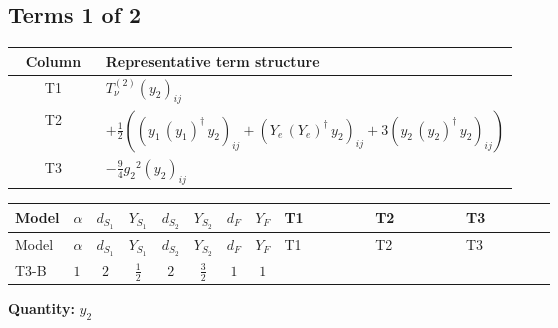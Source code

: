 \documentclass[8pt]{article}
\begin{document}
\begin{landscape}
\subsection*{Terms 1 of 2}
\begin{center}
\begin{tabular}{@{}c >{\raggedright\arraybackslash}p{0.82\linewidth}@{}}
\toprule
Column & Representative term structure \\
\midrule
T1 & \(\displaystyle T_{\nu}^{(2)} \left({y_2}\right)_{ij}\) \\
\midrule
T2 & \(\displaystyle +\frac{1}{2} (\left({y_1}\,\left({y_1}\right)^{\dagger}\,{y_2}\right)_{ij}+\left({Y_e}\,\left({Y_e}\right)^{\dagger}\,{y_2}\right)_{ij}+3 \left({y_2}\,\left({y_2}\right)^{\dagger}\,{y_2}\right)_{ij})\) \\
\midrule
T3 & \(\displaystyle -\frac{9}{4} {g_2}^2 \left({y_2}\right)_{ij}\) \\
\midrule
\bottomrule
\end{tabular}
\end{center}
\smallskip
\tiny
\begin{longtable}{@{}llcccccc >{\raggedright\arraybackslash}p{0.21\linewidth} >{\raggedright\arraybackslash}p{0.21\linewidth} >{\raggedright\arraybackslash}p{0.21\linewidth}@{}}
\toprule
Model & $\alpha$ & $d_{S_1}$ & $Y_{S_1}$ & $d_{S_2}$ & $Y_{S_2}$ & $d_F$ & $Y_F$ & T1 & T2 & T3 \\
\midrule
\endfirsthead
\toprule
Model & $\alpha$ & $d_{S_1}$ & $Y_{S_1}$ & $d_{S_2}$ & $Y_{S_2}$ & $d_F$ & $Y_F$ & T1 & T2 & T3 \\
\midrule
\endhead
T3-B & $1$ & $2$ & $\frac{1}{2}$ & $2$ & $\frac{3}{2}$ & $1$ & $1$ & \scriptsize\adjustbox{max width=\linewidth}{$\begin{gathered} T_{\nu}^{(2)} \left({y_2}\right)_{ij}\end{gathered}$} & \scriptsize\adjustbox{max width=\linewidth}{$\begin{gathered} +\frac{1}{2} (\left({y_1}\,\left({y_1}\right)^{\dagger}\,{y_2}\right)_{ij}+\left({Y_e}\,\left({Y_e}\right)^{\dagger}\,{y_2}\right)_{ij}+3 \left({y_2}\,\left({y_2}\right)^{\dagger}\,{y_2}\right)_{ij})\end{gathered}$} & \scriptsize\adjustbox{max width=\linewidth}{$\begin{gathered} -\frac{9}{4} {g_2}^2 \left({y_2}\right)_{ij}\end{gathered}$} \\
\midrule
\bottomrule
\end{longtable}
\clearpage
\noindent\textbf{Quantity: }$y_2$\par\smallskip

\end{landscape}
\end{document}
